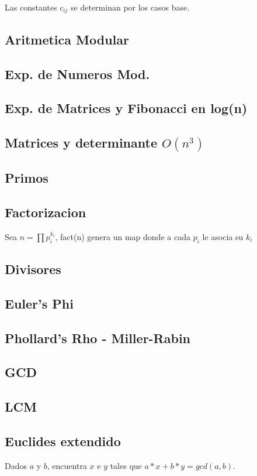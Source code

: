 {Las constantes $c_{ij}$ se determinan por los casos base.
\subsection{Aritmetica Modular}
\subsection{Exp. de Numeros Mod.}
\subsection{Exp. de Matrices y Fibonacci en log(n)}
\subsection{Matrices y determinante $O(n^3)$}
\subsection{Primos}
\subsection{Factorizacion}
Sea $n=\prod{p_i^{k_i}}$, fact(n) genera un map donde a cada $p_i$ le asocia su $k_i$
\subsection{Divisores}
\subsection{Euler's Phi}
\subsection{Phollard's Rho - Miller-Rabin}
\subsection{GCD}
\subsection{LCM}
\subsection{Euclides extendido}
Dados $a$ y $b$, encuentra $x$ e $y$ tales que $a*x + b*y = gcd(a, b)$.
}
